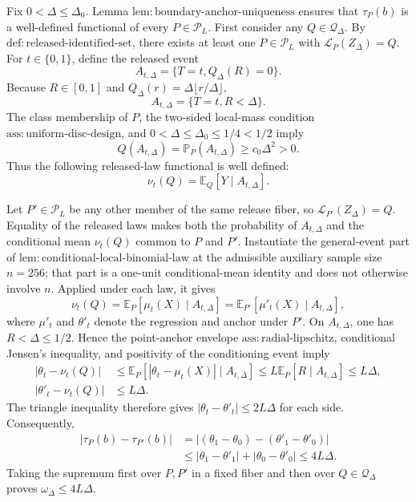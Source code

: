 Fix \(0<\Delta\leq\Delta_0\).  Lemma \(\mathrm{lem:boundary\text{-}anchor\text{-}uniqueness}\) ensures that \(\tau_P(b)\) is a well-defined functional of every \(P\in\mathcal P_L\).  First consider any \(Q\in\mathcal Q_\Delta\).  By \(\mathrm{def:released\text{-}identified\text{-}set}\), there exists at least one \(P\in\mathcal P_L\) with \(\mathcal L_P(Z_\Delta)=Q\).  For \(t\in\{0,1\}\), define the released event
\[
 A_{t,\Delta}=\{T=t,Q_\Delta(R)=0\}.
\]
Because \(R\in[0,1]\) and \(Q_\Delta(r)=\Delta\lfloor r/\Delta\rfloor\),
\[
 A_{t,\Delta}=\{T=t,R<\Delta\}.
\]
The class membership of \(P\), the two-sided local-mass condition \(\mathrm{ass:uniform\text{-}disc\text{-}design}\), and \(0<\Delta\leq\Delta_0\leq1/4<1/2\) imply
\[
 Q(A_{t,\Delta})=\mathbb P_P(A_{t,\Delta})\geq c_0\Delta^2>0.
\]
Thus the following released-law functional is well defined:
\[
 \nu_t(Q)=\mathbb E_Q[Y\mid A_{t,\Delta}].
\]

Let \(P'\in\mathcal P_L\) be any other member of the same release fiber, so \(\mathcal L_{P'}(Z_\Delta)=Q\).  Equality of the released laws makes both the probability of \(A_{t,\Delta}\) and the conditional mean \(\nu_t(Q)\) common to \(P\) and \(P'\).  Instantiate the general-event part of \(\mathrm{lem:conditional\text{-}local\text{-}binomial\text{-}law}\) at the admissible auxiliary sample size \(n=256\); that part is a one-unit conditional-mean identity and does not otherwise involve \(n\).  Applied under each law, it gives
\[
 \nu_t(Q)
 =\mathbb E_P[\mu_t(X)\mid A_{t,\Delta}]
 =\mathbb E_{P'}[\mu'_t(X)\mid A_{t,\Delta}],
\]
where \(\mu'_t\) and \(\theta'_t\) denote the regression and anchor under \(P'\).  On \(A_{t,\Delta}\), one has \(R<\Delta\leq1/2\).  Hence the point-anchor envelope \(\mathrm{ass:radial\text{-}lipschitz}\), conditional Jensen's inequality, and positivity of the conditioning event imply
\[
 \begin{aligned}
 |\theta_t-\nu_t(Q)|
 &\leq\mathbb E_P[|\theta_t-\mu_t(X)|\mid A_{t,\Delta}]
 \leq L\mathbb E_P[R\mid A_{t,\Delta}]
 \leq L\Delta,\\
 |\theta'_t-\nu_t(Q)|&\leq L\Delta.
 \end{aligned}
\]
The triangle inequality therefore gives \(|\theta_t-\theta'_t|\leq2L\Delta\) for each side.  Consequently,
\[
 \begin{aligned}
 |\tau_P(b)-\tau_{P'}(b)|
 &=| (\theta_1-\theta_0)-(\theta'_1-\theta'_0)|\\
 &\leq|\theta_1-\theta'_1|+|\theta_0-\theta'_0|
 \leq4L\Delta.
 \end{aligned}
\]
Taking the supremum first over \(P,P'\) in a fixed fiber and then over \(Q\in\mathcal Q_\Delta\) proves \(\omega_\Delta\leq4L\Delta\).


